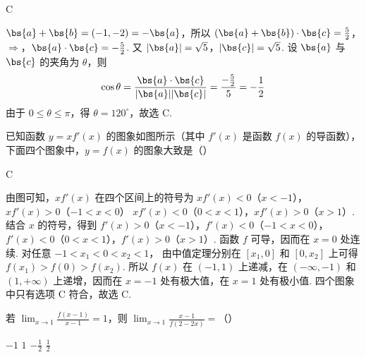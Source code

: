 \begin{answer}C\end{answer}

\begin{solution}
\(\bs{a}+\bs{b}=(-1,-2)=-\bs{a}\)，所以
\((\bs{a}+\bs{b})\cdot\bs{c}=\frac52\)，\(\Longrightarrow\)，\(\bs{a}\cdot\bs{c}=-\frac52\).
又 \(\lvert\bs{a}\rvert=\sqrt5\)，\(\lvert\bs{c}\rvert=\sqrt5\). 设 \(\bs{a}\) 与 \(\bs{c}\) 的夹角为 \(\theta\)，则
\[
\cos\theta=\frac{\bs{a}\cdot\bs{c}}{\lvert\bs{a}\rvert\lvert\bs{c}\rvert}=\frac{-\frac{5}{2}}{5}=-\frac12
\]
由于 \(0\leqslant\theta\leqslant\pi\)，得 \(\theta=120^{\circ}\)，故选 C.
\end{solution}

\begin{problem}
已知函数 \(y=xf'(x)\) 的图象如图所示（其中 \(f'(x)\) 是函数 \(f(x)\) 的导函数），下面四个图象中，\(y=f(x)\) 的图象大致是（\quad）


    {}
    {}
    {}
\end{problem}

\begin{answer}C\end{answer}

\begin{solution}
由图可知，\(xf'(x)\) 在四个区间上的符号为
\(xf'(x)<0\)（\(x<-1\)），\(xf'(x)>0\)（\(-1<x<0\)）
\(xf'(x)<0\)（\(0<x<1\)），\(xf'(x)>0\)（\(x>1\)）.
结合 \(x\) 的符号，得到
\(f'(x)>0\)（\(x<-1\)），\(f'(x)<0\)（\(-1<x<0\)），\(f'(x)<0\)（\(0<x<1\)），\(f'(x)>0\)（\(x>1\)）.
函数 \(f\) 可导，因而在 \(x=0\) 处连续. 对任意 \(-1<x_1<0<x_2<1\)，
由中值定理分别在 \([x_1,0]\) 和 \([0,x_2]\) 上可得
\(f(x_1)>f(0)>f(x_2)\). 所以 \(f(x)\) 在 \((-1,1)\) 上递减，在
\((-\infty,-1)\) 和 \((1,+\infty)\) 上递增，因而在 \(x=-1\) 处有极大值，在
\(x=1\) 处有极小值. 四个图象中只有选项 C 符合，故选 C.
\end{solution}

\begin{problem}
若 \(\displaystyle\lim_{x\to 1}\frac{f(x-1)}{x-1}=1\)，则 \(\displaystyle\lim_{x\to 1}\frac{x-1}{f(2-2x)}=\)（\quad）

\choices
    {\(-1\)}
    {\(1\)}
    {\(-\frac{1}{2}\)}
    {\(\frac{1}{2}\)}
\end{problem}


